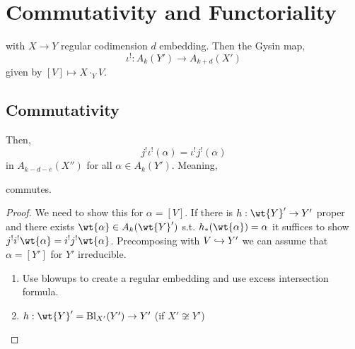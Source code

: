 \documentclass[12pt]{article}
\begin{document}
\section{Commutativity and Functoriality}

\begin{center}
\end{center}
with $X \to Y$ regular codimension $d$ embedding. Then the Gysin map,
\[ \iota^! : A_k(Y') \to A_{k+d}(X') \]
given by $[V] \mapsto X \cdot_Y V$.

\subsection{Commutativity}

\begin{theorem}
\begin{center}
\end{center}
Then,
\[ j^! \iota^! (\alpha) = \iota^! j^! (\alpha) \]
in $A_{k-d-e}(X'')$ for all $\alpha \in A_k(Y')$. Meaning,
\begin{center}
\end{center}
commutes.
\end{theorem}

\begin{proof}
We need to show this for $\alpha = [V]$. If there is $h : \wt{Y}' \to Y'$ proper and there exists $\wt{\alpha} \in A_k(\wt{Y}')$ s.t. $h_*(\wt{\alpha}) = \alpha$ it suffices to show $j^! i^! \wt{\alpha} = i^! j^! \wt{\alpha}$. Precomposing with $V \hookrightarrow Y'$ we can assume that $\alpha = [Y']$ for $Y'$ irreducible. 
\begin{enumerate}
\item Use blowups to create a regular embedding and use excess intersection formula. 

\item $h : \wt{Y}' = \Bl_{X'}(Y') \to Y'$ (if $X' \not\cong Y'$)
\end{enumerate}
\end{proof}
\end{document}
